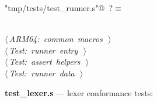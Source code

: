 \documentclass[11pt,a4paper,twoside,openright,DIV=15]{scrbook}
\theoremstyle{definition}
\theoremstyle{plain}
\theoremstyle{remark}
\begin{document}
\begin{flushleft} \small
\begin{minipage}{\linewidth}\label{scrap97}\raggedright\small
{} \verb@"tmp/tests/test_runner.s"@\nobreak\ {\footnotesize {?}}$\equiv$
\vspace{-1ex}
\begin{list}{}{} \item
\mbox{}\verb@@\\
\mbox{}\verb@@\hbox{$\langle\,${\itshape ARM64: common macros}\nobreak\ {\footnotesize {}}$\,\rangle$}\verb@@\\
\mbox{}\verb@@\hbox{$\langle\,${\itshape Test: runner entry}\nobreak\ {\footnotesize {}}$\,\rangle$}\verb@@\\
\mbox{}\verb@@\hbox{$\langle\,${\itshape Test: assert helpers}\nobreak\ {\footnotesize {}}$\,\rangle$}\verb@@\\
\mbox{}\verb@@\hbox{$\langle\,${\itshape Test: runner data}\nobreak\ {\footnotesize {}}$\,\rangle$}\verb@@\\
\mbox{}\verb@@{\NWsep}
\end{list}
\vspace{-1.5ex}
\footnotesize
\begin{list}{}{\setlength{\itemsep}{-\parsep}\setlength{\itemindent}{-\leftmargin}}

\item{}
\end{list}
\end{minipage}\vspace{4ex}
\end{flushleft}
\noindent\textbf{test\_lexer.s} --- lexer conformance tests:
\end{document}
